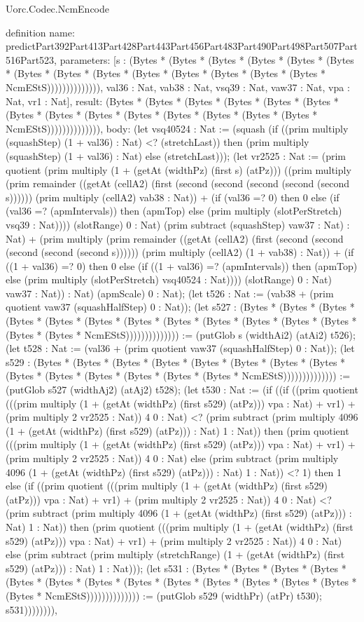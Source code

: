 \begin{lexlean}{Uorc.Codec.NcmEncode}
\begin{semanticmodule}
definition{
  name: predictPart392Part413Part428Part443Part456Part483Part490Part498Part507Part516Part523,
  parameters: [s : (Bytes * (Bytes * (Bytes * (Bytes * (Bytes * (Bytes * (Bytes * (Bytes * (Bytes * (Bytes * (Bytes * (Bytes * (Bytes * (Bytes * NcmEStS)))))))))))))), val36 : Nat, vab38 : Nat, vsq39 : Nat, vaw37 : Nat, vpa : Nat, vr1 : Nat],
  result: (Bytes * (Bytes * (Bytes * (Bytes * (Bytes * (Bytes * (Bytes * (Bytes * (Bytes * (Bytes * (Bytes * (Bytes * (Bytes * (Bytes * NcmEStS)))))))))))))),
  body: (let vsq40524 : Nat := (squash (if ((prim multiply (squashStep) (1 + val36) : Nat) <? (stretchLast)) then (prim multiply (squashStep) (1 + val36) : Nat) else (stretchLast))); (let vr2525 : Nat := (prim quotient (prim multiply (1 + (getAt (widthPz) (first s) (atPz))) ((prim multiply (prim remainder ((getAt (cellA2) (first (second (second (second (second (second s)))))) (prim multiply (cellA2) vab38 : Nat)) + (if (val36 =? 0) then 0 else (if (val36 =? (apmIntervals)) then (apmTop) else (prim multiply (slotPerStretch) vsq39 : Nat)))) (slotRange) 0 : Nat) (prim subtract (squashStep) vaw37 : Nat) : Nat) + (prim multiply (prim remainder ((getAt (cellA2) (first (second (second (second (second (second s)))))) (prim multiply (cellA2) (1 + vab38) : Nat)) + (if ((1 + val36) =? 0) then 0 else (if ((1 + val36) =? (apmIntervals)) then (apmTop) else (prim multiply (slotPerStretch) vsq40524 : Nat)))) (slotRange) 0 : Nat) vaw37 : Nat)) : Nat) (apmScale) 0 : Nat); (let t526 : Nat := (vab38 + (prim quotient vaw37 (squashHalfStep) 0 : Nat)); (let s527 : (Bytes * (Bytes * (Bytes * (Bytes * (Bytes * (Bytes * (Bytes * (Bytes * (Bytes * (Bytes * (Bytes * (Bytes * (Bytes * (Bytes * NcmEStS)))))))))))))) := (putGlob s (widthAi2) (atAi2) t526); (let t528 : Nat := (val36 + (prim quotient vaw37 (squashHalfStep) 0 : Nat)); (let s529 : (Bytes * (Bytes * (Bytes * (Bytes * (Bytes * (Bytes * (Bytes * (Bytes * (Bytes * (Bytes * (Bytes * (Bytes * (Bytes * (Bytes * NcmEStS)))))))))))))) := (putGlob s527 (widthAj2) (atAj2) t528); (let t530 : Nat := (if ((if ((prim quotient (((prim multiply (1 + (getAt (widthPz) (first s529) (atPz))) vpa : Nat) + vr1) + (prim multiply 2 vr2525 : Nat)) 4 0 : Nat) <? (prim subtract (prim multiply 4096 (1 + (getAt (widthPz) (first s529) (atPz))) : Nat) 1 : Nat)) then (prim quotient (((prim multiply (1 + (getAt (widthPz) (first s529) (atPz))) vpa : Nat) + vr1) + (prim multiply 2 vr2525 : Nat)) 4 0 : Nat) else (prim subtract (prim multiply 4096 (1 + (getAt (widthPz) (first s529) (atPz))) : Nat) 1 : Nat)) <? 1) then 1 else (if ((prim quotient (((prim multiply (1 + (getAt (widthPz) (first s529) (atPz))) vpa : Nat) + vr1) + (prim multiply 2 vr2525 : Nat)) 4 0 : Nat) <? (prim subtract (prim multiply 4096 (1 + (getAt (widthPz) (first s529) (atPz))) : Nat) 1 : Nat)) then (prim quotient (((prim multiply (1 + (getAt (widthPz) (first s529) (atPz))) vpa : Nat) + vr1) + (prim multiply 2 vr2525 : Nat)) 4 0 : Nat) else (prim subtract (prim multiply (stretchRange) (1 + (getAt (widthPz) (first s529) (atPz))) : Nat) 1 : Nat))); (let s531 : (Bytes * (Bytes * (Bytes * (Bytes * (Bytes * (Bytes * (Bytes * (Bytes * (Bytes * (Bytes * (Bytes * (Bytes * (Bytes * (Bytes * NcmEStS)))))))))))))) := (putGlob s529 (widthPr) (atPr) t530); s531)))))))),
}
\end{semanticmodule}
\end{lexlean}
